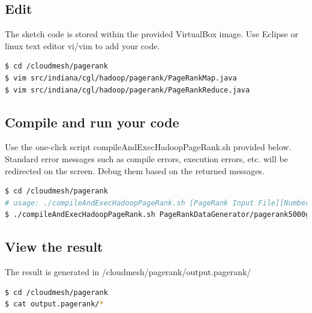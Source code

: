 \subsection*{Edit}
The sketch code is stored within the provided VirtualBox image. Use Eclipse or
linux text editor vi/vim to add your code.

\begin{lstlisting}[language=bash]
$ cd /cloudmesh/pagerank
$ vim src/indiana/cgl/hadoop/pagerank/PageRankMap.java
$ vim src/indiana/cgl/hadoop/pagerank/PageRankReduce.java
\end{lstlisting}


\subsection*{Compile and run your code}

Use the one-click script compileAndExecHadoopPageRank.sh provided below.
Standard error messages such as compile errors, execution errors, etc. will be
redirected on the screen. Debug them based on the returned messages.

\begin{lstlisting}[language=bash]
$ cd /cloudmesh/pagerank
# usage: ./compileAndExecHadoopPageRank.sh [PageRank Input File][Number of Urls][Number Of Iterations]
$ ./compileAndExecHadoopPageRank.sh PageRankDataGenerator/pagerank5000g50.input.0 5000 1
\end{lstlisting}

\subsection*{View the result}
The result is generated in /cloudmesh/pagerank/output.pagerank/
\begin{lstlisting}[language=bash]
$ cd /cloudmesh/pagerank
$ cat output.pagerank/*
\end{lstlisting}
